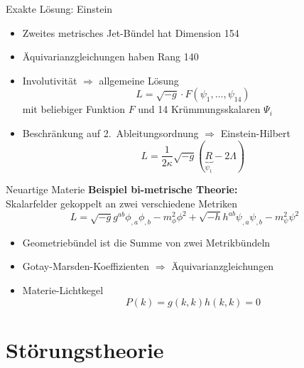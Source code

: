 \documentclass{beamer}
\begin{document}
    \begin{frame}{Exakte Lösung: Einstein}
        \begin{itemize}
            \item Zweites metrisches Jet-Bündel hat Dimension 154
            \item Äquivarianzgleichungen haben Rang 140
            \item Involutivität $\Rightarrow$ allgemeine Lösung
            \[ L = \sqrt{-g} \cdot F(\psi_1,\ldots,\psi_{14}) \]
            mit beliebiger Funktion $F$ und 14 Krümmungsskalaren $\Psi_i$
            \item Beschränkung auf 2.\ Ableitungsordnung $\Rightarrow$ \alert{Einstein-Hilbert}
            \[ L = \frac{1}{2\kappa}\sqrt{-g}(\underbrace{R}_{\psi_1} - 2\Lambda)\]
        \end{itemize}
    \end{frame}

    \begin{frame}{Neuartige Materie}
        \textbf{Beispiel bi-metrische Theorie:}\\ Skalarfelder gekoppelt an zwei verschiedene Metriken
            {\setlength{\belowdisplayskip}{-5pt}
        \[ L = \sqrt{-g} g^{ab} \phi_{,a}\phi_{,b} - m_\phi^2 \phi^2 + \sqrt{-h} h^{ab} \psi_{,a}\psi_{,b} - m_\psi^2 \psi^2 \]} \pause
        \begin{itemize}
            \item Geometriebündel ist die Summe von zwei Metrikbündeln
            \item Gotay-Marsden-Koeffizienten $\Rightarrow$ Äquivarianzgleichungen
            \item Materie-Lichtkegel
            \[ P(k) = g(k,k) h(k,k) = 0 \]
        \end{itemize}
    \end{frame}


    \section{Störungstheorie}\label{sec:stoerungstheorie}
\end{document}
